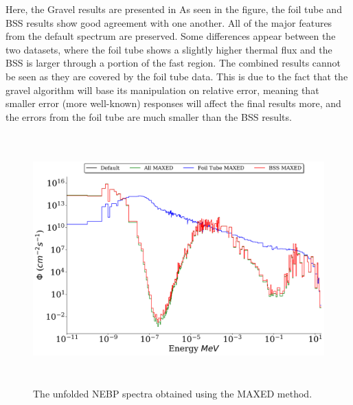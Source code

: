 Here, the Gravel results are presented in 
As seen in the figure, the foil tube and BSS results show good agreement with one another.
All of the major features from the default spectrum are preserved.
Some differences appear between the two datasets, where the foil tube shows a slightly higher thermal flux and the BSS is larger through a portion of the fast region.
The combined results cannot be seen as they are covered by the foil tube data.
This is due to the fact that the gravel algorithm will base its manipulation on relative error, meaning that smaller error (more well-known) responses will affect the final results more, and the errors from the foil tube are much smaller than the BSS results.

\begin{figure}[htb]
\includegraphics[height=3.8in]{tex/figures/unfolded_mx.png}
\caption[MAXED Unfolded Spectra]{The unfolded NEBP spectra obtained using the MAXED method.}
\label{fig:unfolded_mx}
\end{figure}

